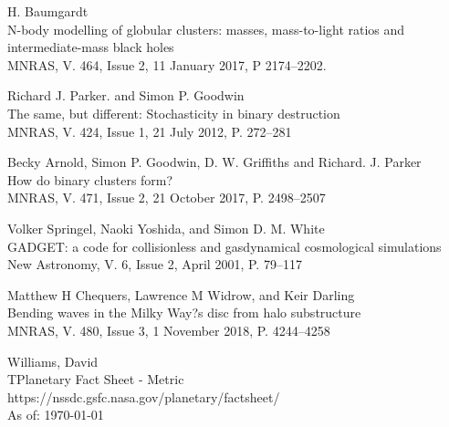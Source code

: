 \documentclass[a4paper,10pt]{article}
\begin{document}
\begin{thebibliography}{9}
H. Baumgardt\\
N-body modelling of globular clusters: masses, mass-to-light ratios and intermediate-mass black holes\\
MNRAS, V. 464, Issue 2, 11 January 2017, P 2174--2202.

Richard J. Parker. and Simon P. Goodwin\\
The same, but different: Stochasticity in binary destruction\\
MNRAS, V. 424, Issue 1, 21 July 2012, P. 272--281

Becky Arnold, Simon P. Goodwin, D. W. Griffiths and Richard. J. Parker\\
How do binary clusters form?\\
MNRAS, V. 471, Issue 2, 21 October 2017, P. 2498--2507

Volker Springel, Naoki Yoshida, and Simon D. M. White\\
GADGET: a code for collisionless and gasdynamical cosmological simulations\\
New Astronomy, V. 6, Issue 2, April 2001, P. 79--117

Matthew H Chequers, Lawrence M Widrow, and Keir Darling\\
Bending waves in the Milky Way?s disc from halo substructure\\
MNRAS, V. 480, Issue 3, 1 November 2018, P. 4244--4258

Williams, David\\
TPlanetary Fact Sheet - Metric\\
https://nssdc.gsfc.nasa.gov/planetary/factsheet/\\ As of: \today

\end{thebibliography}
\end{document}
